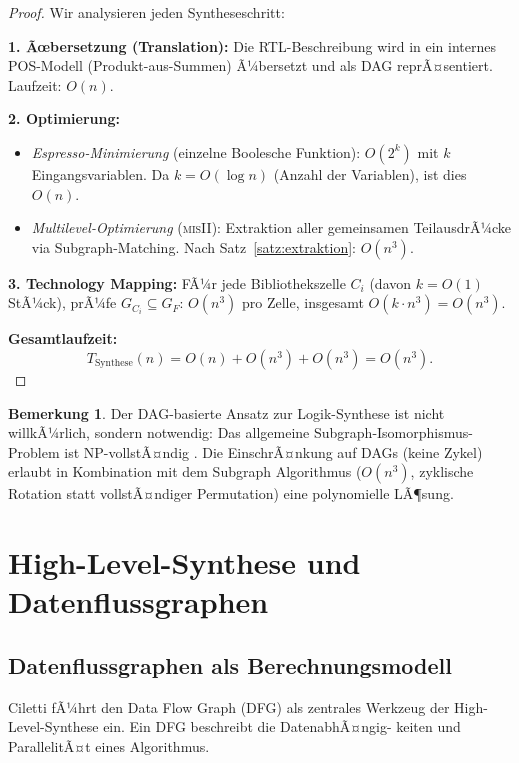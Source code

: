 ﻿\documentclass[a4paper,12pt]{article}
\theoremstyle{definition}
\newtheorem{bemerkung}{Bemerkung}
\begin{document}
\begin{proof}
  Wir analysieren jeden Syntheseschritt:

  \textbf{1. Ãœbersetzung (Translation):} Die RTL-Beschreibung wird in ein internes
  POS-Modell (Produkt-aus-Summen) Ã¼bersetzt und als DAG reprÃ¤sentiert. Laufzeit: $O(n)$.

  \textbf{2. Optimierung:}
  \begin{itemize}
    \item \emph{Espresso-Minimierung} (einzelne Boolesche Funktion): $O(2^k)$ mit $k$
          Eingangsvariablen. Da $k = O(\log n)$ (Anzahl der Variablen), ist dies $O(n)$.
    \item \emph{Multilevel-Optimierung} (\textsc{misII}): Extraktion aller gemeinsamen
          TeilausdrÃ¼cke via Subgraph-Matching. Nach Satz~\ref{satz:extraktion}: $O(n^3)$.
  \end{itemize}

  \textbf{3. Technology Mapping:}
  FÃ¼r jede Bibliothekszelle $C_i$ (davon $k = O(1)$ StÃ¼ck), prÃ¼fe $G_{C_i} \subseteq G_F$:
  $O(n^3)$ pro Zelle, insgesamt $O(k \cdot n^3) = O(n^3)$.

  \textbf{Gesamtlaufzeit:}
  \[
    T_{\text{Synthese}}(n) = O(n) + O(n^3) + O(n^3) = O(n^3).
  \]
\end{proof}

\begin{bemerkung}
  Der DAG-basierte Ansatz zur Logik-Synthese ist nicht willkÃ¼rlich, sondern notwendig:
  Das allgemeine Subgraph-Isomorphismus-Problem ist NP-vollstÃ¤ndig
  \cite{cook1971complexity}. Die EinschrÃ¤nkung auf DAGs (keine Zykel) erlaubt in
  Kombination mit dem Subgraph Algorithmus ($O(n^3)$, zyklische Rotation statt
  vollstÃ¤ndiger Permutation) eine polynomielle LÃ¶sung.
\end{bemerkung}

\section{High-Level-Synthese und Datenflussgraphen}

\subsection{Datenflussgraphen als Berechnungsmodell}

Ciletti \cite[Kap.~9, S.~548--551]{ciletti2011} fÃ¼hrt den Data Flow Graph (DFG) als
zentrales Werkzeug der High-Level-Synthese ein. Ein DFG beschreibt die DatenabhÃ¤ngig-
keiten und ParallelitÃ¤t eines Algorithmus.
\end{document}
